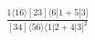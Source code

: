 \documentclass[varwidth, border=5pt]{standalone}
\begin{document}
\begin{my}
$\begin{gathered}
\scriptscriptstyle\frac{1⟨16⟩[23]⟨6|1+5|3]}{[34]⟨56⟩⟨1|2+4|3]^2}
\end{gathered}$
\end{my}
\end{document}
